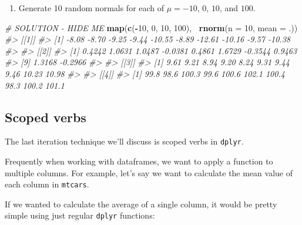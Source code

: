 \documentclass[]{book}
\newenvironment{Shaded}{\begin{snugshade}}{\end{snugshade}}
\newcommand{\KeywordTok}[1]{\textcolor[rgb]{0.13,0.29,0.53}{\textbf{#1}}}
\newcommand{\DataTypeTok}[1]{\textcolor[rgb]{0.13,0.29,0.53}{#1}}
\newcommand{\DecValTok}[1]{\textcolor[rgb]{0.00,0.00,0.81}{#1}}
\newcommand{\StringTok}[1]{\textcolor[rgb]{0.31,0.60,0.02}{#1}}
\newcommand{\CommentTok}[1]{\textcolor[rgb]{0.56,0.35,0.01}{\textit{#1}}}
\newcommand{\OperatorTok}[1]{\textcolor[rgb]{0.81,0.36,0.00}{\textbf{#1}}}
\newcommand{\NormalTok}[1]{#1}
\providecommand{\tightlist}{%
  \setlength{\itemsep}{0pt}\setlength{\parskip}{0pt}}
\begin{document}
\begin{enumerate}
\def\labelenumi{\arabic{enumi}.}
\setcounter{enumi}{2}
\tightlist
\item
  Generate 10 random normals for each of \(\mu = -10\), \(0\), \(10\),
  and \(100\).
\end{enumerate}

\begin{Shaded}
\begin{Highlighting}[]
\CommentTok{# SOLUTION - HIDE ME}
\KeywordTok{map}\NormalTok{(}\KeywordTok{c}\NormalTok{(}\OperatorTok{-}\DecValTok{10}\NormalTok{, }\DecValTok{0}\NormalTok{, }\DecValTok{10}\NormalTok{, }\DecValTok{100}\NormalTok{), }\OperatorTok{~}\KeywordTok{rnorm}\NormalTok{(}\DataTypeTok{n =} \DecValTok{10}\NormalTok{, }\DataTypeTok{mean =}\NormalTok{ .))}
\CommentTok{#> [[1]]}
\CommentTok{#>  [1]  -8.08  -8.70  -9.25  -9.44 -10.55  -8.89 -12.61 -10.16  -9.57 -10.38}
\CommentTok{#> }
\CommentTok{#> [[2]]}
\CommentTok{#>  [1]  0.4242  1.0631  1.0487 -0.0381  0.4861  1.6729 -0.3544  0.9463}
\CommentTok{#>  [9]  1.3168 -0.2966}
\CommentTok{#> }
\CommentTok{#> [[3]]}
\CommentTok{#>  [1]  9.61  9.21  8.94  9.20  8.24  9.31  9.44  9.46 10.23 10.98}
\CommentTok{#> }
\CommentTok{#> [[4]]}
\CommentTok{#>  [1]  99.8  98.6 100.3  99.6 100.6 102.1 100.4  98.3 100.2 101.1}
\end{Highlighting}
\end{Shaded}

\subsection{Scoped verbs}\label{scoped-verbs}

The last iteration technique we'll discuss is scoped verbs in
\texttt{dplyr}.

Frequently when working with dataframes, we want to apply a function to
multiple columns. For example, let's say we want to calculate the mean
value of each column in \texttt{mtcars}.

If we wanted to calculate the average of a single column, it would be
pretty simple using just regular \texttt{dplyr} functions:

\begin{Shaded}
\end{Shaded}
\end{document}
